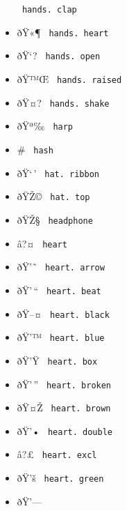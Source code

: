 \begin{itemize}
{  \texttt{\ hands.\ clap\ }}
\item
  \label{symbol-hands.heart}{{ ðŸ«¶ }
  \texttt{\ hands.\ heart\ }}
\item
  \label{symbol-hands.open}{{ ðŸ`? }
  \texttt{\ hands.\ open\ }}
\item
  \label{symbol-hands.raised}{{ ðŸ™Œ }
  \texttt{\ hands.\ raised\ }}
\item
  \label{symbol-hands.shake}{{ ðŸ¤? }
  \texttt{\ hands.\ shake\ }}
\item
  \label{symbol-harp}{{ ðŸª‰ } \texttt{\ harp\ }}
\item
  \label{symbol-hash}{{ \# } \texttt{\ hash\ }}
\item
  \label{symbol-hat.ribbon}{{ ðŸ`\,' }
  \texttt{\ hat.\ ribbon\ }}
\item
  \label{symbol-hat.top}{{ ðŸŽ© } \texttt{\ hat.\ top\ }}
\item
  \label{symbol-headphone}{{ ðŸŽ§ }
  \texttt{\ headphone\ }}
\item
  \label{symbol-heart}{{ â?¤ } \texttt{\ heart\ }}
\item
  \label{symbol-heart.arrow}{{ ðŸ'˜ }
  \texttt{\ heart.\ arrow\ }}
\item
  \label{symbol-heart.beat}{{ ðŸ'\,`` }
  \texttt{\ heart.\ beat\ }}
\item
  \label{symbol-heart.black}{{ ðŸ--¤ }
  \texttt{\ heart.\ black\ }}
\item
  \label{symbol-heart.blue}{{ ðŸ'™ }
  \texttt{\ heart.\ blue\ }}
\item
  \label{symbol-heart.box}{{ ðŸ'Ÿ }
  \texttt{\ heart.\ box\ }}
\item
  \label{symbol-heart.broken}{{ ðŸ'\,'' }
  \texttt{\ heart.\ broken\ }}
\item
  \label{symbol-heart.brown}{{ ðŸ¤Ž }
  \texttt{\ heart.\ brown\ }}
\item
  \label{symbol-heart.double}{{ ðŸ'• }
  \texttt{\ heart.\ double\ }}
\item
  \label{symbol-heart.excl}{{ â?£ }
  \texttt{\ heart.\ excl\ }}
\item
  \label{symbol-heart.green}{{ ðŸ'š }
  \texttt{\ heart.\ green\ }}
\item
  \label{symbol-heart.grow}{{ ðŸ'--- }
}
\end{itemize}

